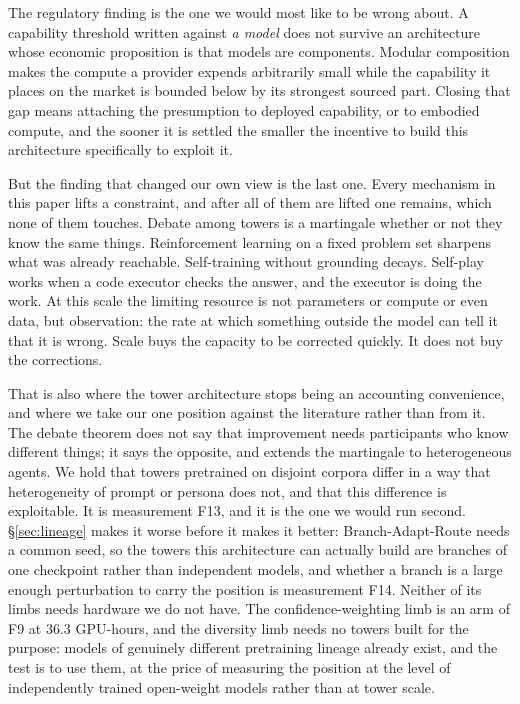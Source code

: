 \documentclass[11pt]{article}
\begin{document}
The regulatory finding is the one we would most like to be wrong about. A capability threshold written against \emph{a model} does not survive an architecture whose economic proposition is that models are components. Modular composition makes the compute a provider expends arbitrarily small while the capability it places on the market is bounded below by its strongest sourced part. Closing that gap means attaching the presumption to deployed capability, or to embodied compute, and the sooner it is settled the smaller the incentive to build this architecture specifically to exploit it.

But the finding that changed our own view is the last one. Every mechanism in this paper lifts a constraint, and after all of them are lifted one remains, which none of them touches. Debate among towers is a martingale whether or not they know the same things. Reinforcement learning on a fixed problem set sharpens what was already reachable. Self-training without grounding decays. Self-play works when a code executor checks the answer, and the executor is doing the work. At this scale the limiting resource is not parameters or compute or even data, but observation: the rate at which something outside the model can tell it that it is wrong. Scale buys the capacity to be corrected quickly. It does not buy the corrections.

That is also where the tower architecture stops being an accounting convenience, and where we take our one position against the literature rather than from it. The debate theorem does not say that improvement needs participants who know different things; it says the opposite, and extends the martingale to heterogeneous agents. We hold that towers pretrained on disjoint corpora differ in a way that heterogeneity of prompt or persona does not, and that this difference is exploitable. It is measurement F13, and it is the one we would run second. \S\ref{sec:lineage} makes it worse before it makes it better: Branch-Adapt-Route needs a common seed, so the towers this architecture can actually build are branches of one checkpoint rather than independent models, and whether a branch is a large enough perturbation to carry the position is measurement F14. Neither of its limbs needs hardware we do not have. The confidence-weighting limb is an arm of F9 at 36.3 GPU-hours, and the diversity limb needs no towers built for the purpose: models of genuinely different pretraining lineage already exist, and the test is to use them, at the price of measuring the position at the level of independently trained open-weight models rather than at tower scale.
\end{document}
